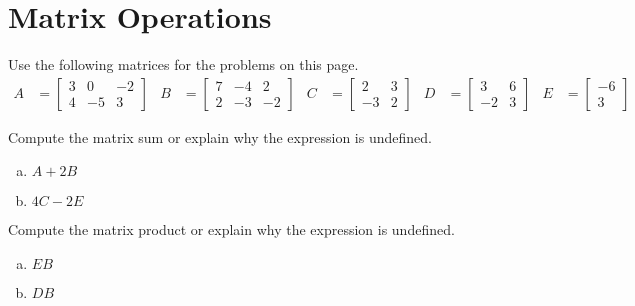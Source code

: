 \section{Matrix Operations}
\name

Use the following matrices for the problems on this page.
\begin{align*}
A &= \begin{bmatrix}3&0&-2\\4&-5&3\end{bmatrix} &
B &= \begin{bmatrix}7&-4&2\\2&-3&-2\end{bmatrix} &
C &= \begin{bmatrix}2&3\\-3&2\end{bmatrix} &
D &= \begin{bmatrix}3&6\\-2&3\end{bmatrix} &
E &= \begin{bmatrix}-6\\3\end{bmatrix}
\end{align*}

\begin{exercise} %
	Compute the matrix sum or explain why the expression is undefined.
	\begin{multicols}{2}
		\begin{enumerate}[(a)]
			\item $A+2B$
			\item $4C-2E$
		\end{enumerate}
	\end{multicols}
\end{exercise}
\vfill


\begin{exercise} %
	Compute the matrix product or explain why the expression is undefined.
	\begin{multicols}{2}
		\begin{enumerate}[(a)]
			\item $EB$
			\item $DB$
		\end{enumerate}
	\end{multicols}
\end{exercise}
\vfill


\newpage


